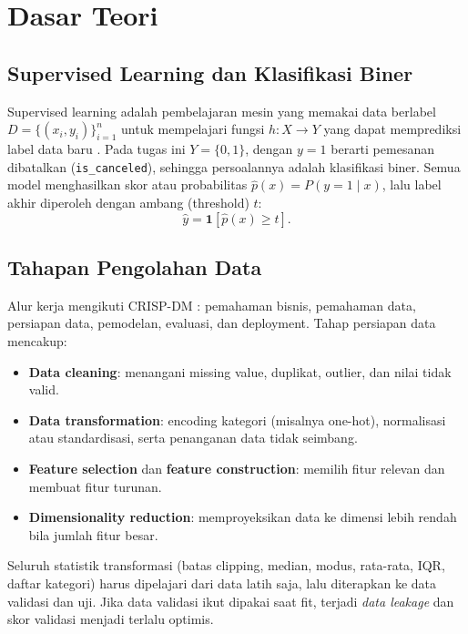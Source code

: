 \chapter{Dasar Teori}

\section{Supervised Learning dan Klasifikasi Biner}
Supervised learning adalah pembelajaran mesin yang memakai data berlabel $D=\{(x_i,y_i)\}_{i=1}^{n}$ untuk mempelajari fungsi $h:X\rightarrow Y$ yang dapat memprediksi label data baru \cite{ref:intro}. Pada tugas ini $Y=\{0,1\}$, dengan $y=1$ berarti pemesanan dibatalkan (\texttt{is\_canceled}), sehingga persoalannya adalah klasifikasi biner. Semua model menghasilkan skor atau probabilitas $\hat{p}(x)=P(y=1\mid x)$, lalu label akhir diperoleh dengan ambang (threshold) $t$:
\begin{equation}
  \hat{y} = \mathbf{1}\left[\hat{p}(x) \geq t\right].
\end{equation}

\section{Tahapan Pengolahan Data}
Alur kerja mengikuti CRISP-DM \cite{ref:crispdm}: pemahaman bisnis, pemahaman data, persiapan data, pemodelan, evaluasi, dan deployment. Tahap persiapan data \cite{ref:dataprep} mencakup:
\begin{itemize}
  \item \textbf{Data cleaning}: menangani missing value, duplikat, outlier, dan nilai tidak valid.
  \item \textbf{Data transformation}: encoding kategori (misalnya one-hot), normalisasi atau standardisasi, serta penanganan data tidak seimbang.
  \item \textbf{Feature selection} dan \textbf{feature construction}: memilih fitur relevan dan membuat fitur turunan.
  \item \textbf{Dimensionality reduction}: memproyeksikan data ke dimensi lebih rendah bila jumlah fitur besar.
\end{itemize}
Seluruh statistik transformasi (batas clipping, median, modus, rata-rata, IQR, daftar kategori) harus dipelajari dari data latih saja, lalu diterapkan ke data validasi dan uji. Jika data validasi ikut dipakai saat fit, terjadi \emph{data leakage} dan skor validasi menjadi terlalu optimis.

